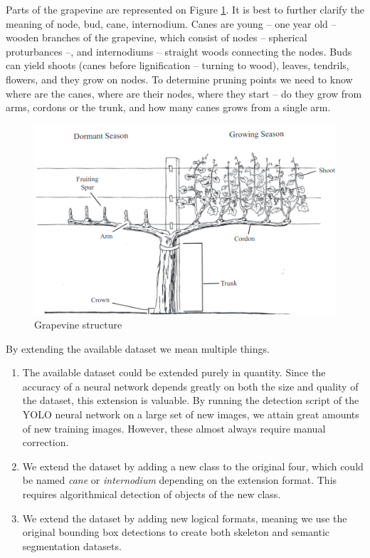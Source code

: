 \documentclass{PSAIE}%
\begin{document}
Parts of the grapevine are represented on Figure \ref{fig_grapevine_structure}. It is best to further clarify
the meaning of node, bud, cane, internodium. Canes are young -- one year old -- wooden branches of the
grapevine, which consist of nodes -- spherical proturbances --, and internodiums -- straight woods connecting
the nodes. Buds can yield shoots (canes before lignification -- turning to wood), leaves, tendrils, flowers,
and they grow on nodes. To determine pruning points we need to know where are the canes, where are their nodes,
where they start -- do they grow from arms, cordons or the trunk, and how many canes grows from a single arm.

\begin{figure}[h]
      \centering
      \includegraphics[scale=0.7]{images/grapevine_structure.png}
      \caption{Grapevine structure \cite{hellman2003grapevine}}
      \label{fig_grapevine_structure}
\end{figure}

By extending the available dataset we mean multiple things.
\begin{enumerate}
      \item The available dataset could be extended purely in quantity. Since the accuracy of a neural network
            depends greatly on both the size and quality of the dataset, this extension is valuable.
            By running the detection script of the YOLO neural network on a large set of new images,
            we attain great amounts of new training images. However, these almost always require
            manual correction.
      \item We extend the dataset by adding a new class to the original four, which could be named \textit{cane}
            or \textit{internodium} depending on the extension format. This requires algorithmical detection of
            objects of the new class.
      \item We extend the dataset by adding new logical formats, meaning we use the original bounding box
            detections to create both skeleton and semantic segmentation datasets.
\end{enumerate}
\end{document}
